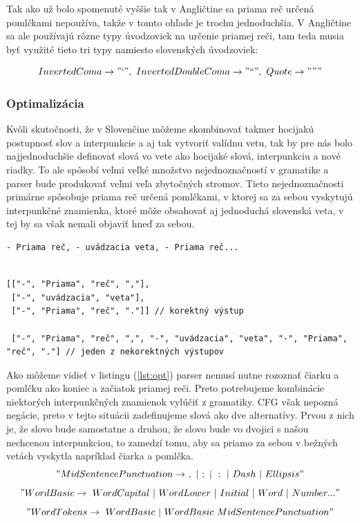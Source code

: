 \documentclass[12pt,a4paper]{report}
\theoremstyle{definition}
\theoremstyle{remark}
\begin{document}
Tak ako už bolo spomenuté vyššie tak v Angličtine sa priama reč určená pomlčkami nepoužíva, takže v tomto ohľade je trochu jednoduchšia. V Angličtine sa ale používajú rôzne typy úvodzoviek na určenie priamej reči, tam teda musia byť využité tieto tri typy namiesto slovenských úvodzoviek:

$$InvertedComa \to "\text{`}", \ InvertedDoubleComa \to"\text{``}", \  Quote \to """$$

\subsubsection{Optimalizácia}
Kvôli skutočnosti, že v Slovenčine môžeme skombinovať takmer hocijakú postupnosť slov a interpunkcie a aj tak vytvoriť valídnu vetu, tak by pre nás bolo najjednoduchšie definovať slová vo vete ako hocijaké slová, interpunkciu a nové riadky. To ale spôsobí veľmi veľké množstvo nejednoznačností v gramatike a parser bude produkovať veľmi veľa zbytočných stromov. Tieto nejednoznačnosti primárne spôsobuje priama reč určená pomlčkami, v ktorej sa za sebou vyskytujú interpunkčné znamienka, ktoré môže obsahovať aj jednoduchá slovenská veta, v tej by sa však nemali objaviť hneď za sebou.
\begin{lstlisting}[caption={Nejednoznačný vstup},style=htmlcssjs]
- Priama reč, - uvádzacia veta, - Priama reč...
\end{lstlisting}
\begin{lstlisting}[caption={Výstupné vety vo forme polí},style=htmlcssjs, label={lst:opt}]

[["-", "Priama", "reč", ","],
 ["-", "uvádzacia", "veta"],
 ["-", "Priama", "reč", "."]] // korektný výstup
 
 ["-", "Priama", "reč", ",", "-", "uvádzacia", "veta", "-", "Priama", "reč", "."] // jeden z nekorektných výstupov
\end{lstlisting}
Ako môžeme vidieť v listingu (\ref{lst:opt}) parser nemusí nutne rozoznať čiarku a pomlčku ako koniec a začiatok priamej reči. Preto potrebujeme kombinácie niektorých interpunkčných znamienok vylúčiť z gramatiky. CFG však nepozná negácie, preto v tejto situácii zadefinujeme slová ako dve alternatívy. Prvou z nich je, že slovo bude samostatne a druhou, že slovo bude vo dvojici s našou nechcenou interpunkciou, to zamedzí tomu, aby sa priamo za sebou v bežných vetách vyskytla napríklad čiarka a pomlčka.
$$"MidSentencePunctuation \to \ , \ | \ ; \ | \ : \ | \ Dash \  | \ Ellipsis"$$
$$"WordBasic \to  \ WordCapital \ | \ WordLower \ | \ Initial \ | \ Word \ | \ Number ..."$$
$$"WordTokens  \to\  WordBasic \ | \ WordBasic \ MidSentencePunctuation"$$
\end{document}
